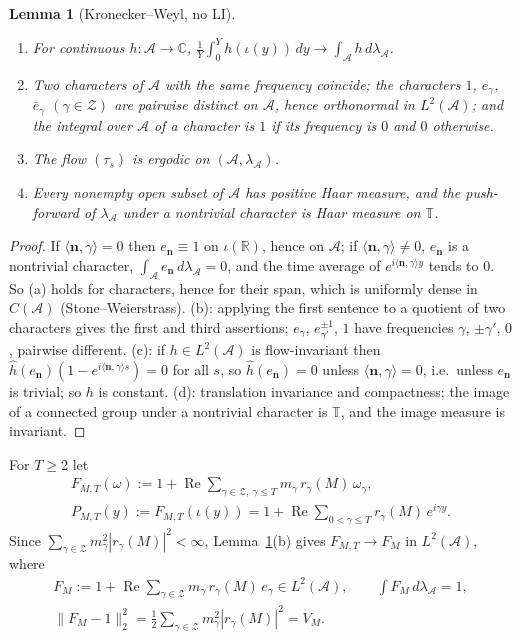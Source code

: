 \documentclass[11pt]{amsart}
\newtheorem{lemma}[theorem]{Lemma}
\theoremstyle{definition}
\numberwithin{equation}{section}
\newcommand{\re}{\operatorname{Re}}
\newcommand{\cA}{\mathcal A}          %
\newcommand{\cZ}{\mathcal Z}          %
\newcommand{\hA}{\lambda_{\cA}}       %
\begin{document}
\begin{lemma}[Kronecker--Weyl, no LI]\label{lem:KW}
\begin{enumerate}
\item[(a)] For continuous $h:\cA\to\mathbb C$,
$\frac1Y\int_0^Yh(\iota(y))\,dy\to\int_{\cA}h\,d\hA$.
\item[(b)] Two characters of $\cA$ with the same frequency coincide;
the characters $1$, $e_\gamma$, $\bar e_\gamma$ $(\gamma\in\cZ)$ are
pairwise distinct on $\cA$, hence orthonormal in $L^2(\cA)$; and the
integral over $\cA$ of a character is $1$ if its frequency is $0$
and $0$ otherwise.
\item[(c)] The flow $(\tau_s)$ is ergodic on $(\cA,\hA)$.
\item[(d)] Every nonempty open subset of $\cA$ has positive Haar
measure, and the push-forward of $\hA$ under a nontrivial character
is Haar measure on $\mathbb T$.
\end{enumerate}
\end{lemma}

\begin{proof}
If $\langle\mathbf n,\gamma\rangle=0$ then $e_{\mathbf n}\equiv1$ on
$\iota(\mathbb R)$, hence on $\cA$; if
$\langle\mathbf n,\gamma\rangle\ne0$, $e_{\mathbf n}$ is a nontrivial
character, $\int_{\cA}e_{\mathbf n}\,d\hA=0$, and the time average of
$e^{i\langle\mathbf n,\gamma\rangle y}$ tends to $0$. So (a) holds for
characters, hence for their span, which is uniformly dense in
$C(\cA)$ (Stone--Weierstrass). (b): applying the first sentence to a
quotient of two characters gives the first and third assertions;
$e_\gamma$, $e_{\gamma'}^{\pm1}$, $1$ have frequencies $\gamma$,
$\pm\gamma'$, $0$, pairwise different. (c): if $h\in L^2(\cA)$ is
flow-invariant then
$\hat h(e_{\mathbf n})(1-e^{i\langle\mathbf n,\gamma\rangle s})=0$
for all $s$, so $\hat h(e_{\mathbf n})=0$ unless
$\langle\mathbf n,\gamma\rangle=0$, i.e.\ unless $e_{\mathbf n}$ is
trivial; so $h$ is constant. (d): translation invariance and
compactness; the image of a connected group under a nontrivial
character is $\mathbb T$, and the image measure is invariant.
\end{proof}

For $T\ge2$ let
\begin{gather*}
F_{M,T}(\omega):=1+\re\sum_{\gamma\in\cZ,\ \gamma\le T}
m_\gamma\,r_\gamma(M)\,\omega_\gamma,\\
P_{M,T}(y):=F_{M,T}(\iota(y))
=1+\re\sum_{0<\gamma\le T}r_\gamma(M)\,e^{i\gamma y}.
\end{gather*}
Since $\sum_{\gamma\in\cZ}m_\gamma^2|r_\gamma(M)|^2<\infty$,
Lemma~\ref{lem:KW}(b) gives $F_{M,T}\to F_M$ in $L^2(\cA)$, where
\begin{equation}\label{eq:FM}
\begin{gathered}
F_M:=1+\re\sum_{\gamma\in\cZ}m_\gamma\,r_\gamma(M)\,e_\gamma\in L^2(\cA),
\qquad\int F_M\,d\hA=1,\\
\|F_M-1\|_2^2=\tfrac12\sum_{\gamma\in\cZ}m_\gamma^2|r_\gamma(M)|^2=V_M .
\end{gathered}
\end{equation}
\end{document}
